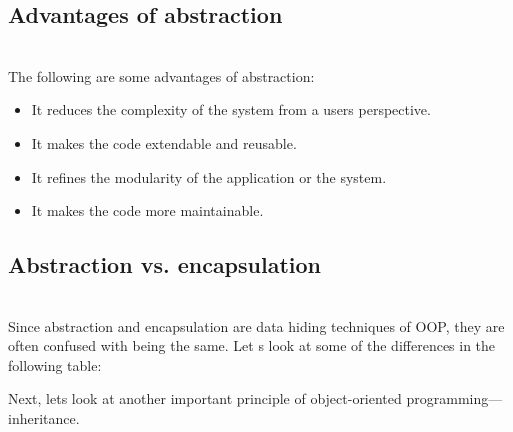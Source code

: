 \subsection{Advantages of abstraction}\label{XCJW7e-AXwdYx2ZHlSxfb}
\\
The following are some advantages of abstraction:

\begin{itemize}
\item
\protect{}\label{GQoChZIDe6_ko65YMF-l9}
It reduces the complexity of the system from a user\textquotesingle s perspective.
\item
\protect{}\label{gc4G9GW2tFLv2BPoPOivA}
It makes the code extendable and reusable.
\item
\protect{}\label{DIloc5HQeKaMfRqKko_EP}
It refines the modularity of the application or the system.
\item
\protect{}\label{IBfw-s4WoTrgsR5S8Smf7}
It makes the code more maintainable.
\end{itemize}

\subsection{Abstraction vs. encapsulation}\label{2WiTRiThVea4dNqTw2fgZ}
\\
Since abstraction and encapsulation are data hiding techniques of OOP, they are often confused with being the same. Let
\textquotesingle s look at some of the differences in the following table:

\begin{table}[htbp]
\centering
\small
{}
\end{table}

Next, let\textquotesingle s look at another important principle of object-oriented programming---inheritance.

